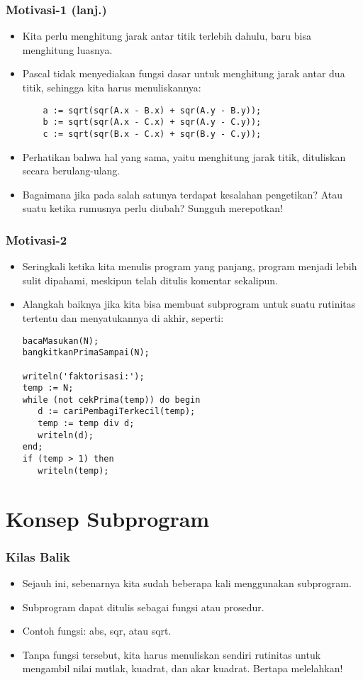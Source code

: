 \documentclass{beamer}
\begin{document}
\begin{frame}[fragile]
\frametitle{Motivasi-1 (lanj.)}
\begin{itemize}
	\item Kita perlu menghitung jarak antar titik terlebih dahulu, baru bisa menghitung luasnya.
	\item Pascal tidak menyediakan fungsi dasar untuk menghitung jarak antar dua titik, sehingga kita harus menuliskannya:
	\begin{lstlisting}
	a := sqrt(sqr(A.x - B.x) + sqr(A.y - B.y));
	b := sqrt(sqr(A.x - C.x) + sqr(A.y - C.y));
	c := sqrt(sqr(B.x - C.x) + sqr(B.y - C.y));
	\end{lstlisting}
	\item Perhatikan bahwa hal yang sama, yaitu menghitung jarak titik, dituliskan secara berulang-ulang.
	\item Bagaimana jika pada salah satunya terdapat kesalahan pengetikan? Atau suatu ketika rumusnya perlu diubah? Sungguh merepotkan!
\end{itemize}
\end{frame}

\begin{frame}[fragile]
\frametitle{Motivasi-2}
\begin{itemize}
	\item Seringkali ketika kita menulis program yang panjang, program menjadi lebih sulit dipahami, meskipun telah ditulis komentar sekalipun.
	\item Alangkah baiknya jika kita bisa membuat subprogram untuk suatu rutinitas tertentu dan menyatukannya di akhir, seperti:
	\begin{lstlisting}
bacaMasukan(N);
bangkitkanPrimaSampai(N);

writeln('faktorisasi:');
temp := N;
while (not cekPrima(temp)) do begin
   d := cariPembagiTerkecil(temp);
   temp := temp div d;
   writeln(d);
end;
if (temp > 1) then
   writeln(temp);
	\end{lstlisting}
\end{itemize}
\end{frame}

\section{Konsep Subprogram}
\frame{\sectionpage}

\begin{frame}
\frametitle{Kilas Balik}
\begin{itemize}
	\item Sejauh ini, sebenarnya kita sudah beberapa kali menggunakan subprogram.
	\item Subprogram dapat ditulis sebagai \alert{fungsi} atau \alert{prosedur}.
	\item Contoh fungsi: abs, sqr, atau sqrt.
	\item Tanpa fungsi tersebut, kita harus menuliskan sendiri rutinitas untuk mengambil nilai mutlak, kuadrat, dan akar kuadrat. Bertapa melelahkan!
\end{itemize}
\end{frame}
\end{document}
